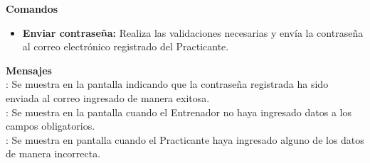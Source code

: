 \textbf{\textcolor[rgb]{0, 0, 0.545098}{Comandos}}
\begin{itemize}
	\item \textbf{\textcolor[rgb]{0, 0, 0.545098}{Enviar contraseña:}}  Realiza las validaciones necesarias y envía la contraseña al correo electrónico registrado del Practicante.	
\end{itemize}

\vspace{1em}

\textbf{\textcolor[rgb]{0, 0, 0.545098}{Mensajes}}\\
	
\textbf{}: Se muestra en la pantalla  indicando que la contraseña registrada ha sido enviada al correo ingresado de manera exitosa.\\

\textbf{}: Se muestra en la pantalla  cuando el Entrenador no haya ingresado datos a los campos obligatorios.\\

\textbf{}: Se muestra en pantalla cuando el Practicante haya ingresado alguno de los datos de manera incorrecta.\\

\clearpage